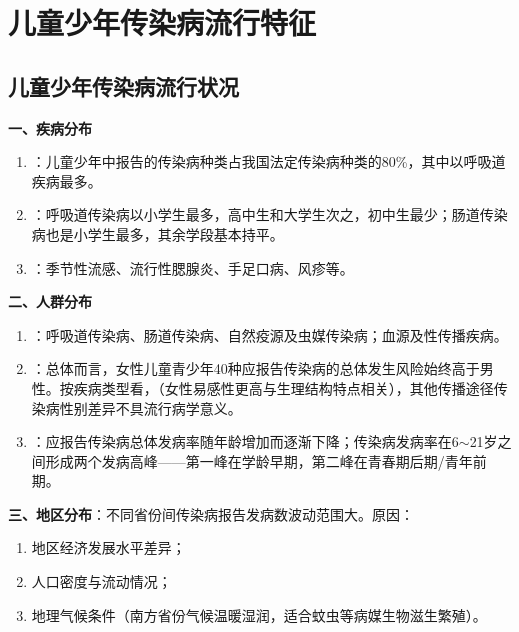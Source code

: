 \section{儿童少年传染病流行特征}

\subsection{儿童少年传染病流行状况}

\begin{keybox}
\textbf{一、疾病分布}
\begin{enumerate}[leftmargin=*]
    \item {}：儿童少年中报告的传染病种类占我国法定传染病种类的80\%，其中以呼吸道疾病最多。
    \item {}：呼吸道传染病以小学生最多，高中生和大学生次之，初中生最少；肠道传染病也是小学生最多，其余学段基本持平。
    \item {}：季节性流感、流行性腮腺炎、手足口病、风疹等。
\end{enumerate}

\textbf{二、人群分布}
\begin{enumerate}[leftmargin=*]
    \item {}：呼吸道传染病、肠道传染病、自然疫源及虫媒传染病；血源及性传播疾病。
    \item {}：总体而言，女性儿童青少年40种应报告传染病的总体发生风险始终高于男性。按疾病类型看，（女性易感性更高与生理结构特点相关），其他传播途径传染病性别差异不具流行病学意义。
    \item {}：应报告传染病总体发病率随年龄增加而逐渐下降；传染病发病率在6$\sim$21岁之间形成两个发病高峰——第一峰在学龄早期，第二峰在青春期后期/青年前期。
\end{enumerate}

\textbf{三、地区分布}：不同省份间传染病报告发病数波动范围大。原因：
\begin{enumerate}[leftmargin=*]
    \item 地区经济发展水平差异；
    \item 人口密度与流动情况；
    \item 地理气候条件（南方省份气候温暖湿润，适合蚊虫等病媒生物滋生繁殖）。
\end{enumerate}


\end{keybox}

